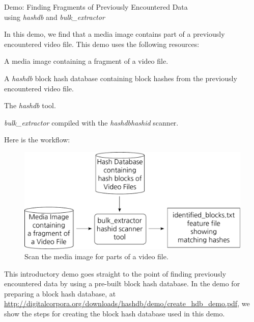 \documentclass[12pt,twoside]{article}
\newcommand{\hdb}{\emph{hashdb}\xspace}
\newcommand{\bulk}{\emph{bulk\_extractor}\xspace}
\newcommand{\hashid}{\emph{hashid}\xspace}
\begin{document}
\begin{center}
\Large Demo: Finding Fragments of Previously Encountered Data \\
\large using \hdb and \bulk
\end{center}

In this demo, we find that a media image contains part of a
previously encountered video file.
This demo uses the following resources:
\begin{compactitem}
\item A media image containing a fragment of a video file.
\item A \hdb block hash database containing block hashes
from the previously encountered video file.
\item The \hdb tool.
\item \bulk compiled with the \hdb \hashid scanner.
\end{compactitem}

Here is the workflow:

\begin{figure}[H]
  \center
  \includegraphics[scale=0.6]{drawings/scan_hashid}
  \caption*{Scan the media image for parts of a video file.}
  \label{fig:scan_hashid}
\end{figure}

This introductory demo goes straight to the point of finding
previously encountered data by using a pre-built block hash database.
In the demo for preparing a block hash database, at
\url{http://digitalcorpora.org/downloads/hashdb/demo/create\_hdb\_demo.pdf},
we show the steps for creating the block hash database used in this demo.
\end{document}

